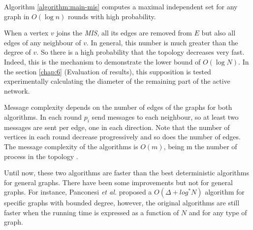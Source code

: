 \begin{theorem}

Algorithm \ref{algorithm:main-mis} computes a maximal independent set for any graph in $O(\log n)$ rounds with high probability.

\end{theorem}

 When a vertex $v$ joins the \textit{MIS}, all its edges are removed from $E$ but also all edges of any neighbour of $v$. In general, this number is much greater than the degree of $v$. So there is a high probability that the topology decreases very fast. Indeed, this is the mechanism to demonstrate the lower bound of $O(\log N)$.  In the section \ref{chap:6} (Evaluation of results), this supposition is tested experimentally calculating the diameter of the remaining part of the active network. 
 
 
Message complexity depends on the number of edges of the graphs for both algorithms. In each round $p_i$ send messages to each neighbour, so at least two messages are sent per edge, one in each direction. Note that the number of vertices in each round decrease progressively and so does the number of edges. The message complexity of the algorithms is $O(m)$, being m the number of process in the topology \cite{luby1986simple}.


 Until now, these two algorithms are faster than the best deterministic algorithms for general graphs. There have been some improvements but not for general graphs. For instance, Panconesi \textit{et al.} \cite{panconesi1996complexity} proposed a $O(\Delta + log^* N)$ algorithm for specific graphs with bounded degree, however, the original algorithms are still faster when the running time is expressed as a function of $N$ and for any type of graph.
 

 

